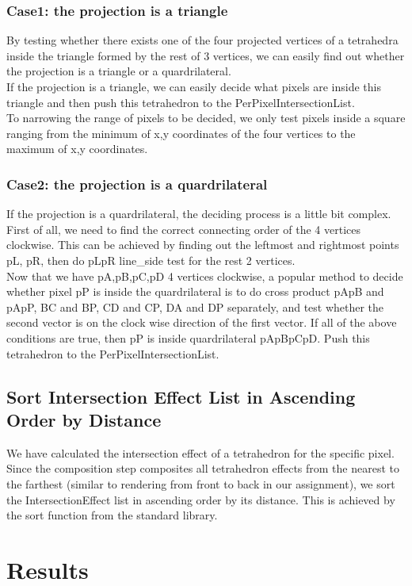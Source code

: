 \documentclass[acmtog]{acmart}
\begin{document}
\subsubsection{Case1: the projection is a triangle}
By testing whether there exists one of the four projected vertices of a tetrahedra inside the triangle formed by the rest of 3 vertices, we can easily find out whether the projection is a triangle or a quardrilateral.
\\If the projection is a triangle, we can easily decide what pixels are inside this triangle and then push this tetrahedron to the PerPixelIntersectionList.
\\To narrowing the range of pixels to be decided, we only test pixels inside a square ranging from the minimum of x,y coordinates of the four vertices to the maximum of x,y coordinates.
\\
\subsubsection{Case2: the projection is a quardrilateral}
If the projection is a quardrilateral, the deciding process is a little bit complex. First of all, we need to find the correct connecting order of the 4 vertices clockwise. This can be achieved by finding out the leftmost and rightmost points pL, pR, then do pLpR line\_side test for the rest 2 vertices.
\\Now that we have pA,pB,pC,pD 4 vertices clockwise, a popular method to decide whether pixel pP is inside the quardrilateral is to do cross product pApB and pApP, BC and BP, CD and CP, DA and DP separately, and test whether the second vector is on the clock wise direction of the first vector. If all of the above conditions are true, then pP is inside quardrilateral pApBpCpD. Push this tetrahedron to the PerPixelIntersectionList.
\\
\subsection{Sort Intersection Effect List in Ascending Order by Distance}
We have calculated the intersection effect of a tetrahedron for the specific pixel. Since the composition step composites all tetrahedron effects from the nearest to the farthest (similar to rendering from front to back in our assignment), we sort the IntersectionEffect list in ascending order by its distance. This is achieved by the sort function from the standard library.
\\




\section{Results}
\end{document}
